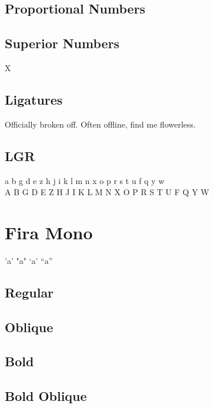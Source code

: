 \documentclass{article}
\begin{document}
\subsection*{Proportional Numbers}

{}

\subsection*{Superior Numbers}

X{}

\subsection*{Ligatures}


Officially broken off. Often offline, find me flowerless.

\subsection*{LGR}

{\firalgr\noindent
 a b g d e z h j i k l m n x o p r s t u f q y w\\
 A B G D E Z H J I K L M N X O P R S T U F Q Y W\\
}

\section*{Fira Mono}
\ttfamily


'a' \quad "a" \quad `a' \quad ``a''

\subsection*{Regular}

\lipsum[1]


\subsection*{Oblique}

\textsl{\lipsum[1]}

\subsection*{Bold}

\textbf{\lipsum[3]}

\subsection*{Bold Oblique}
\end{document}
